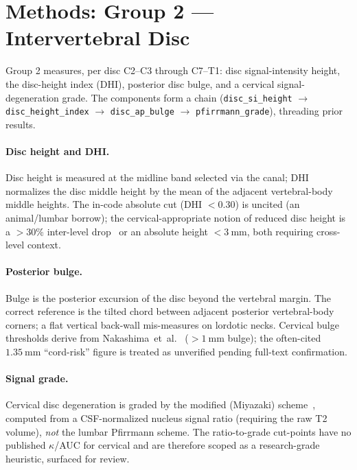 \section{Methods: Group 2 --- Intervertebral Disc}
\label{sec:g2}

Group 2 measures, per disc C2--C3 through C7--T1: disc signal-intensity height, the disc-height index
(DHI), posterior disc bulge, and a cervical signal-degeneration grade. The components form a chain
(\texttt{disc\_si\_height} $\rightarrow$ \texttt{disc\_height\_index} $\rightarrow$ \texttt{disc\_ap\_bulge}
$\rightarrow$ \texttt{pfirrmann\_grade}), threading prior results.

\paragraph{Disc height and DHI.} Disc height is measured at the midline band selected via the canal;
DHI normalizes the disc middle height by the mean of the adjacent vertebral-body middle heights. The
in-code absolute cut (DHI $<0.30$) is uncited (an animal/lumbar borrow); the cervical-appropriate
notion of reduced disc height is a $>$30\% inter-level drop~\cite{suzuki2018} or an absolute height
$<\SI{3}{\milli\meter}$, both requiring cross-level context.

\paragraph{Posterior bulge.} Bulge is the posterior excursion of the disc beyond the vertebral margin.
The correct reference is the tilted chord between adjacent posterior vertebral-body corners; a flat
vertical back-wall mis-measures on lordotic necks. Cervical bulge thresholds derive from
Nakashima~et~al.~\cite{nakashima2015} ($>\SI{1}{\milli\meter}$ bulge); the often-cited
$\SI{1.35}{\milli\meter}$ ``cord-risk'' figure is treated as unverified pending full-text confirmation.

\paragraph{Signal grade.} Cervical disc degeneration is graded by the modified (Miyazaki)
scheme~\cite{miyazaki2008}, computed from a CSF-normalized nucleus signal ratio (requiring the raw T2
volume), \emph{not} the lumbar Pfirrmann scheme. The ratio-to-grade cut-points have no published
$\kappa$/AUC for cervical and are therefore scoped as a research-grade heuristic, surfaced for review.

